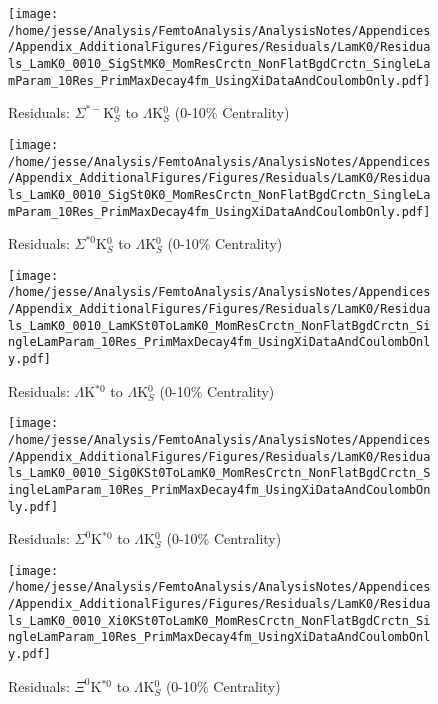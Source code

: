 \documentclass[/home/jesse/Analysis/FemtoAnalysis/AnalysisNotes/AnalysisNoteJBuxton.tex]{subfiles}
\begin{document}
\begin{figure}[h]
  \centering
  \texttt{[image: /home/jesse/Analysis/FemtoAnalysis/AnalysisNotes/Appendices/Appendix\_AdditionalFigures/Figures/Residuals/LamK0/Residuals\_LamK0\_0010\_SigStMK0\_MomResCrctn\_NonFlatBgdCrctn\_SingleLamParam\_10Res\_PrimMaxDecay4fm\_UsingXiDataAndCoulombOnly.pdf]}
  \caption[Residuals: $\Sigma^{*-}$K$^{0}_{S}$ to $\Lambda$K$^{0}_{S}$ (0-10\% Centrality)]{Residuals: $\Sigma^{*-}$K$^{0}_{S}$ to $\Lambda$K$^{0}_{S}$ (0-10\% Centrality)}
  \label{fig:Res_LamK0_0010_SigStMK0}
\end{figure}

\begin{figure}[h]
  \centering
  \texttt{[image: /home/jesse/Analysis/FemtoAnalysis/AnalysisNotes/Appendices/Appendix\_AdditionalFigures/Figures/Residuals/LamK0/Residuals\_LamK0\_0010\_SigSt0K0\_MomResCrctn\_NonFlatBgdCrctn\_SingleLamParam\_10Res\_PrimMaxDecay4fm\_UsingXiDataAndCoulombOnly.pdf]}
  \caption[Residuals: $\Sigma^{*0}$K$^{0}_{S}$ to $\Lambda$K$^{0}_{S}$ (0-10\% Centrality)]{Residuals: $\Sigma^{*0}$K$^{0}_{S}$ to $\Lambda$K$^{0}_{S}$ (0-10\% Centrality)}
  \label{fig:Res_LamK0_0010_SigSt0K0}
\end{figure}


\begin{figure}[h]
  \centering
  \texttt{[image: /home/jesse/Analysis/FemtoAnalysis/AnalysisNotes/Appendices/Appendix\_AdditionalFigures/Figures/Residuals/LamK0/Residuals\_LamK0\_0010\_LamKSt0ToLamK0\_MomResCrctn\_NonFlatBgdCrctn\_SingleLamParam\_10Res\_PrimMaxDecay4fm\_UsingXiDataAndCoulombOnly.pdf]}
  \caption[Residuals: $\Lambda$K$^{*0}$ to $\Lambda$K$^{0}_{S}$ (0-10\% Centrality)]{Residuals: $\Lambda$K$^{*0}$ to $\Lambda$K$^{0}_{S}$ (0-10\% Centrality)}
  \label{fig:Res_LamK0_0010_LamKSt0}
\end{figure}


\begin{figure}[h]
  \centering
  \texttt{[image: /home/jesse/Analysis/FemtoAnalysis/AnalysisNotes/Appendices/Appendix\_AdditionalFigures/Figures/Residuals/LamK0/Residuals\_LamK0\_0010\_Sig0KSt0ToLamK0\_MomResCrctn\_NonFlatBgdCrctn\_SingleLamParam\_10Res\_PrimMaxDecay4fm\_UsingXiDataAndCoulombOnly.pdf]}
  \caption[Residuals: $\Sigma^{0}$K$^{*0}$ to $\Lambda$K$^{0}_{S}$ (0-10\% Centrality)]{Residuals: $\Sigma^{0}$K$^{*0}$ to $\Lambda$K$^{0}_{S}$ (0-10\% Centrality)}
  \label{fig:Res_LamK0_0010_Sig0KSt0}
\end{figure}


\begin{figure}[h]
  \centering
  \texttt{[image: /home/jesse/Analysis/FemtoAnalysis/AnalysisNotes/Appendices/Appendix\_AdditionalFigures/Figures/Residuals/LamK0/Residuals\_LamK0\_0010\_Xi0KSt0ToLamK0\_MomResCrctn\_NonFlatBgdCrctn\_SingleLamParam\_10Res\_PrimMaxDecay4fm\_UsingXiDataAndCoulombOnly.pdf]}
  \caption[Residuals: $\Xi^{0}$K$^{*0}$ to $\Lambda$K$^{0}_{S}$ (0-10\% Centrality)]{Residuals: $\Xi^{0}$K$^{*0}$ to $\Lambda$K$^{0}_{S}$ (0-10\% Centrality)}
  \label{fig:Res_LamK0_0010_Xi0KSt0}
\end{figure}
\end{document}
